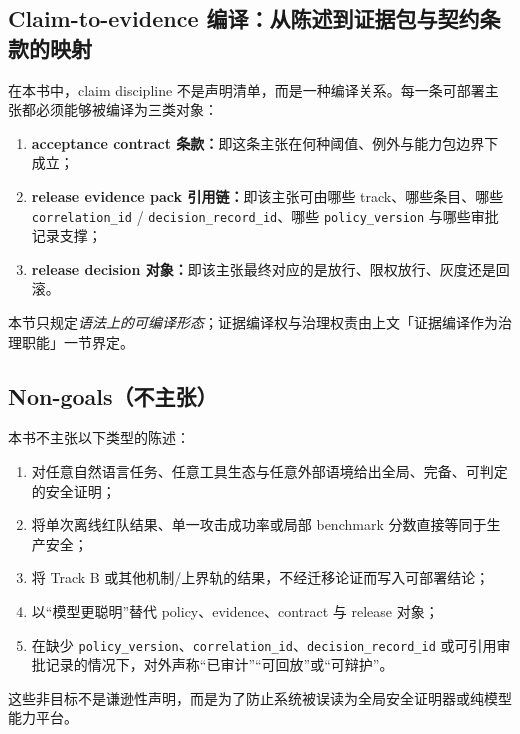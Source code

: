 \documentclass[11pt,a4paper]{report}
\begin{document}
\subsection{Claim-to-evidence 编译：从陈述到证据包与契约条款的映射}
在本书中，claim discipline 不是声明清单，而是一种编译关系。每一条可部署主张都必须能够被编译为三类对象：
\begin{enumerate}
  \item \textbf{acceptance contract 条款：}即这条主张在何种阈值、例外与能力包边界下成立；
  \item \textbf{release evidence pack 引用链：}即该主张可由哪些 track、哪些条目、哪些 \texttt{correlation\_id} / \texttt{decision\_record\_id}、哪些 \texttt{policy\_version} 与哪些审批记录支撑；
  \item \textbf{release decision 对象：}即该主张最终对应的是放行、限权放行、灰度还是回滚。
\end{enumerate}
\noindent 本节只规定\emph{语法上的可编译形态}；证据编译权与治理权责由上文「证据编译作为治理职能」一节界定。

\subsection{Non-goals（不主张）}
本书不主张以下类型的陈述：
\begin{enumerate}
  \item 对任意自然语言任务、任意工具生态与任意外部语境给出全局、完备、可判定的安全证明；
  \item 将单次离线红队结果、单一攻击成功率或局部 benchmark 分数直接等同于生产安全；
  \item 将 Track B 或其他机制/上界轨的结果，不经迁移论证而写入可部署结论；
  \item 以“模型更聪明”替代 policy、evidence、contract 与 release 对象；
  \item 在缺少 \texttt{policy\_version}、\texttt{correlation\_id}、\texttt{decision\_record\_id} 或可引用审批记录的情况下，对外声称“已审计”“可回放”或“可辩护”。
\end{enumerate}
\noindent 这些非目标不是谦逊性声明，而是为了防止系统被误读为全局安全证明器或纯模型能力平台。
\end{document}

